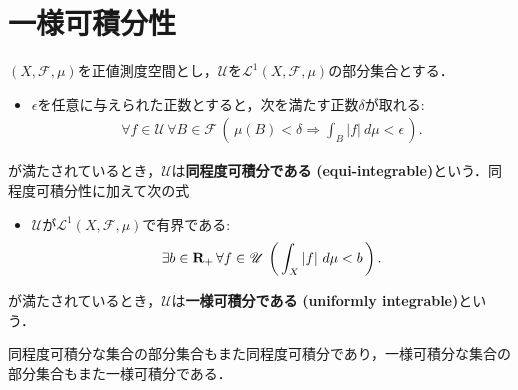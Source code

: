 \section{一様可積分性}
	\begin{screen}
		\begin{dfn}[一様可積分]
			$(X,\mathscr{F},\mu)$を正値測度空間とし，$\mathscr{U}$を$\mathscr{L}^1(X,\mathscr{F},\mu)$の部分集合とする．
			\begin{itemize}
				\item $\epsilon$を任意に与えられた正数とすると，次を満たす正数$\delta$が取れる:
					\begin{align}
						\forall f \in \mathscr{U}\, \forall B \in \mathscr{F}\, \left(\, \mu(B) < \delta
						\Longrightarrow \int_B |f|\ d\mu < \epsilon\, \right).
					\end{align}
			\end{itemize}
			が満たされているとき，$\mathscr{U}$は{\bf 同程度可積分である}
			{\bf (equi-integrable)}という．同程度可積分性に加えて次の式
			\begin{itemize}
				\item $\mathscr{U}$が$\mathscr{L}^1(X,\mathscr{F},\mu)$で有界である:
					\begin{align}
						\exists b \in \mathbf{R}_+\, \forall f \in \mathscr{U}\, 
						\left(\, \int_X|f|\ d\mu < b\, \right).
					\end{align}
			\end{itemize}
			が満たされているとき，$\mathscr{U}$は{\bf 一様可積分である}
			{\bf (uniformly integrable)}という．
		\end{dfn}
	\end{screen}
	
	同程度可積分な集合の部分集合もまた同程度可積分であり，一様可積分な集合の部分集合もまた一様可積分である．
	
